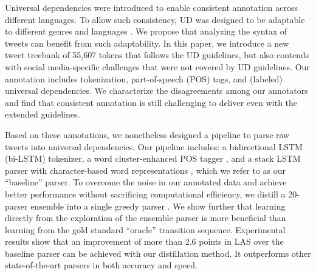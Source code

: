 \documentclass[11pt,a4paper]{article}
\newcommand{\yjcomment}[1]{\textcolor{orange}{[$_\mathrm{L}^\mathrm{Y}$#1]}}
\newcommand{\nascomment}[1]{\textcolor{blue}{[#1 ---\textsc{nas}]}}
\begin{document}

Universal dependencies \citep[UD]{NIVRE16.348} were introduced to enable
consistent annotation across different languages. To allow such
consistency, UD was designed to be adaptable to different genres \cite{wang-EtAl:2017:Long6} 
and languages \cite{guo-EtAl:2015:ACL-IJCNLP2,TACL892}. We propose that analyzing
the syntax of tweets can benefit from such adaptability. In this paper,
we introduce a new tweet treebank of 55,607 tokens that follows the UD
guidelines, but also contends with social media-specific challenges that were not
covered by UD guidelines. Our annotation includes 
tokenization, part-of-speech (POS) tags, and (labeled) universal dependencies.
We characterize the disagreements among our annotators and find that
consistent annotation is still challenging to deliver even with
the extended guidelines.


Based on these annotations, we nonetheless designed a pipeline to parse 
raw tweets into universal dependencies. Our pipeline includes: a
bidirectional LSTM (bi-LSTM) tokenizer, a word cluster-enhanced POS
tagger \citep[following][]{owoputi-EtAl:2013:NAACL-HLT}, and a stack LSTM parser
with character-based word representations
\cite{ballesteros-dyer-smith:2015:EMNLP}, which we refer to as our
``baseline'' parser.
To overcome the noise in our annotated data and achieve better performance
without sacrificing computational efficiency, we 
distill a 20-parser ensemble into a single greedy  parser 
\cite{DBLP:journals/corr/HintonVD15}.
We show further  that learning directly from the exploration of the ensemble parser
is more beneficial than learning from the gold standard ``oracle''
transition sequence. Experimental results show that an improvement of more
than 2.6 points in LAS over the
baseline parser can be achieved with our distillation method.  It outperforms
other state-of-the-art parsers in both accuracy and speed.
\end{document}
